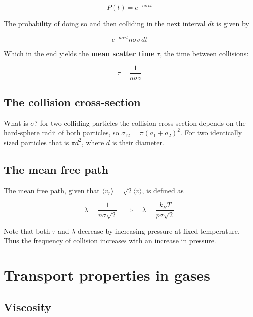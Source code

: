 \documentclass[a4paper]{article}
\begin{document}
\begin{equation}
	P(t)=e^{-n\sigma vt}
\end{equation}

The probability of doing so and then colliding in the next interval $dt$ is given by

\begin{equation}
	e^{-n\sigma vt}n\sigma v\,dt
\end{equation}

Which in the end yields the \textbf{mean scatter time} $\tau$, the time between collisions:

\begin{equation}
	\tau = \frac{1}{n\sigma v}
\end{equation}

\subsection{The collision cross-section}

What is $\sigma$? for two colliding particles the collision cross-section depends on the hard-sphere radii of both particles, so $\sigma_{12}=\pi(a_1+a_2)^2$. For two identically sized particles that is $\pi d^2$, where $d$ is their diameter.

\subsection{The mean free path}

The mean free path, given that $\langle v_r\rangle=\sqrt{2}\langle v\rangle$, is defined as

\begin{equation}
	\lambda = \frac{1}{n\sigma\sqrt{2}}\quad\Rightarrow\quad \lambda = \frac{k_BT}{p\sigma\sqrt{2}}
\end{equation}

Note that both $\tau$ and $\lambda$ decrease by increasing pressure at fixed temperature. Thus the frequency of collision increases with an increase in pressure.

\section{Transport properties in gases}

\subsection{Viscosity}
\end{document}
